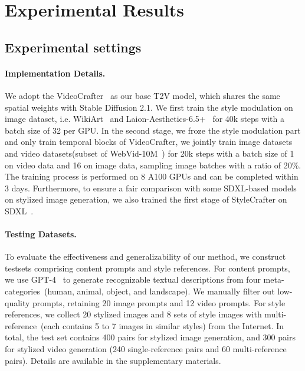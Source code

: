 \vspace{-0.3em}
\section{Experimental Results}
\label{sec:result}

\subsection{Experimental settings}
\label{subsec:experiment_setting}

\paragraph{Implementation Details.} 
We adopt the VideoCrafter~\cite{chen2023videocrafter} as our base T2V model, which shares the same spatial weights with Stable Diffusion 2.1. We first train the style modulation on image dataset, i.e. WikiArt~\cite{phillips2011wiki} and Laion-Aesthetics-6.5+~\cite{schuhmann2022laion} for 40k steps with a batch size of 32 per GPU.  In the second stage, we froze the style modulation part and only train temporal blocks of VideoCrafter, we jointly train image datasets and video datasets(subset of WebVid-10M~\cite{bain2021frozen}) for 20k steps with a batch size of 1 on video data and 16 on image data, sampling image batches with a ratio of 20\%. The training process is performed on 8 A100 GPUs and can be completed within 3 days. Furthermore, to ensure a fair comparison with some SDXL-based models~\cite{ye2023ipadapter, hertz2023style} on stylized image generation, we also trained the first stage of StyleCrafter on SDXL~\cite{podell2023sdxl}. 


\paragraph{Testing Datasets.}
\label{sec:test_dataset}
To evaluate the effectiveness and generalizability of our method, we construct testsets comprising content prompts and style references. For content prompts, we use GPT-4~\cite{openai2023gpt4v} to generate recognizable textual descriptions from four meta-categories~(human, animal, object, and landscape). We manually filter out low-quality prompts, retaining 20 image prompts and 12 video prompts. For style references, we collect 20 stylized images and 8 sets of style images with multi-reference~(each contains 5 to 7 images in similar styles) from the Internet. In total, the test set contains 400 pairs for stylized image generation, and 300 pairs for stylized video generation (240 single-reference pairs and 60 multi-reference pairs). Details are available in the supplementary materials.

